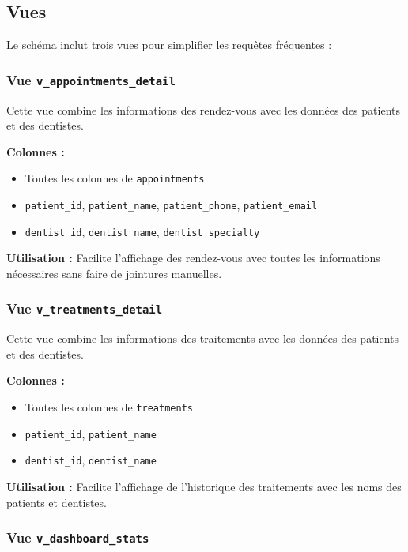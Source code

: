\documentclass[12pt,a4paper]{report}
\begin{document}
\subsection{Vues}

Le schéma inclut trois vues pour simplifier les requêtes fréquentes :

\subsubsection{Vue \texttt{v\_appointments\_detail}}

Cette vue combine les informations des rendez-vous avec les données des patients et des dentistes.

\textbf{Colonnes :}
\begin{itemize}
    \item Toutes les colonnes de \texttt{appointments}
    \item \texttt{patient\_id}, \texttt{patient\_name}, \texttt{patient\_phone}, \texttt{patient\_email}
    \item \texttt{dentist\_id}, \texttt{dentist\_name}, \texttt{dentist\_specialty}
\end{itemize}

\textbf{Utilisation :} Facilite l'affichage des rendez-vous avec toutes les informations nécessaires sans faire de jointures manuelles.

\subsubsection{Vue \texttt{v\_treatments\_detail}}

Cette vue combine les informations des traitements avec les données des patients et des dentistes.

\textbf{Colonnes :}
\begin{itemize}
    \item Toutes les colonnes de \texttt{treatments}
    \item \texttt{patient\_id}, \texttt{patient\_name}
    \item \texttt{dentist\_id}, \texttt{dentist\_name}
\end{itemize}

\textbf{Utilisation :} Facilite l'affichage de l'historique des traitements avec les noms des patients et dentistes.

\subsubsection{Vue \texttt{v\_dashboard\_stats}}
\end{document}
